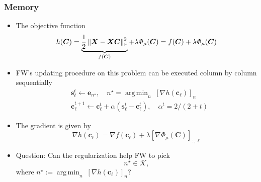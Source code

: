 \documentclass[10pt,xcolor={usenames,dvipsnames,table}]{beamer}
\newcommand{\norm}[1]{\left\lVert#1\right\rVert}
\DeclareMathOperator*{\argmin}{arg\,min}
\begin{document}
\begin{frame}
\frametitle{Memory}    
\begin{itemize}
    \item The objective function 
        \[
        h(\bm{C}) = \underbrace{\dfrac{1}{2} \norm{\bm{X} - \bm{X}\bm{C}}_{\rm F}^2}_{f(\bm{C})} + \lambda \varPhi_{\mu}(\bm{C}) = f(\bm{C}) + \lambda \varPhi_{\mu}(\bm{C})
    \]
    \item FW's updating procedure on this problem can be executed column by column sequentially
    \begin{align*}
    &\bm{s}_\ell^{t} \leftarrow \bm{e}_{n^{\star}}, \quad n^{\star} = \argmin_{n} \; [\nabla h(\bm{c}_\ell)]_n  \\
    &\bm{c}_\ell^{t+1} \leftarrow \bm{c}_\ell^{t} + \alpha (\bm{s}_{\ell}^{t}-\bm{c}_{\ell}^{t}), \quad \alpha^{t} = 2/(2+t)
    \end{align*} 
    \item The gradient is given by
\[ 
    \nabla h(\bm{c}_\ell) = \nabla f(\bm{c}_\ell) + \lambda [\nabla \varPhi_{\mu}(\bm{C})]_{:, \ell} 
\] 
\item Question: Can the regularization help FW to pick 
    \[
        n^{\star} \in \mathcal{K},
    \] where
    $n^{\star} := \argmin_{n}\;[\nabla h(\bm{c}_\ell)]_n$?
\end{itemize}


\end{frame}
\end{document}
